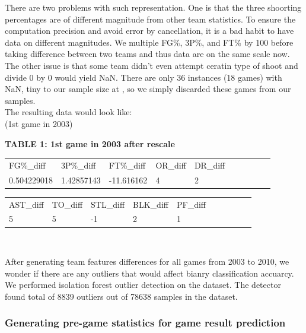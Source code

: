 \documentclass[12pt]{article}
\begin{document}
\quad There are two problems with such representation. One is that the three shoorting percentages are of different magnitude from other team statistics. To ensure the computation precision and avoid error by cancellation, it is a bad habit to have data on different magnitudes. We multiple FG\%, 3P\%, and FT\% by 100 before taking difference between two teams and thus data are on the same scale now. The other issue is that some team didn’t even attempt ceratin type of shoot and divide 0 by 0 would yield NaN. There are only 36 instances (18 games) with NaN, tiny to our sample size at  , so we simply discarded these games from our samples. \\ 

The resulting data would look like: \\

(1st game in 2003)

\textbf{TABLE 1: 1st game in 2003 after rescale }

\begin{table}[h]
\begin{tabular}{llllllllll}
FG\%\_diff  & 3P\%\_diff & FT\%\_diff & OR\_diff & DR\_diff \\
0.504229018 & 1.42857143 & -11.616162 & 4  & 2 
\end{tabular} 
\end{table}

\begin{table}[h]
\begin{tabular}{llllllllll}
AST\_diff & TO\_diff & STL\_diff & BLK\_diff& PF\_diff\\
5 &5 &-1 &2 &1
\end{tabular} \\
\end{table}


\quad After generating team features differences for all games from 2003 to 2010, we wonder if there are any outliers that would affect bianry classification accuarcy. We performed isolation forest outlier detection on the dataset. The detector found total of 8839 outliers out of 78638 samples in the dataset. 

\subsubsection{Generating pre-game statistics for game result prediction}
\end{document}
